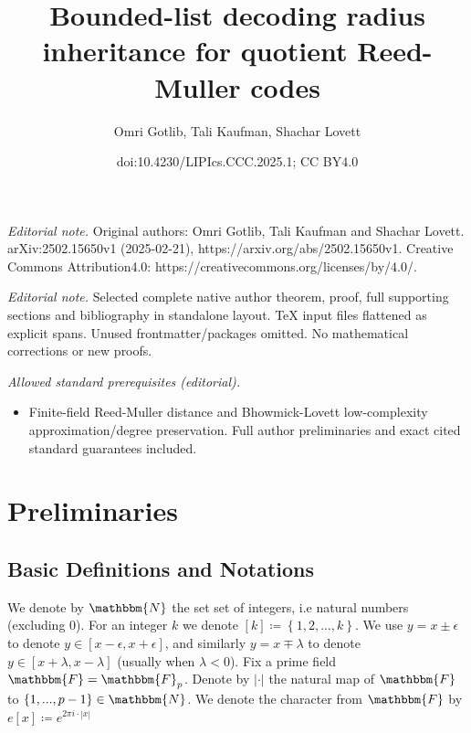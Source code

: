 \documentclass[10pt,a4paper]{article}
\title{Bounded-list decoding radius inheritance for quotient Reed-Muller codes}
\author{Omri Gotlib, Tali Kaufman, Shachar Lovett}
\date{doi:10.4230/LIPIcs.CCC.2025.1; CC BY4.0}
\newcommand{\definedas}[0]{\coloneqq}
\newcommand{\sparens}[1]{\left[ #1 \right]}
\newcommand{\set}[1]{\left\{ #1 \right\}}
\newcommand{\basefield}[0]{\mathbbm{F}}
\newcommand{\charfunc}[1]{e \sparens{#1}}
\newcommand{\genprime}[0]{p}
\newcommand{\naturalnumbersset}[0]{\mathbbm{N}}
\newcommand{\abs}[1]{\left| #1 \right|}
\begin{document}
\maketitle
\setcounter{section}{1}
\noindent\textit{Editorial note.} Original authors: Omri Gotlib, Tali Kaufman and Shachar Lovett. arXiv:2502.15650v1 (2025-02-21), https://arxiv.org/abs/2502.15650v1. Creative Commons Attribution4.0: https://creativecommons.org/licenses/by/4.0/.\par\medskip
\noindent\textit{Editorial note.} Selected complete native author theorem, proof, full supporting sections and bibliography in standalone layout. TeX input files flattened as explicit spans. Unused frontmatter/packages omitted. No mathematical corrections or new proofs.\par\medskip
\noindent\textit{Allowed standard prerequisites (editorial).}\begin{itemize}
\item Finite-field Reed-Muller distance and Bhowmick-Lovett low-complexity approximation/degree preservation. Full author preliminaries and exact cited standard guarantees included.
\end{itemize}\medskip
\section[Preliminaries]{Preliminaries}\label{sec:preliminaries}

\subsection{Basic Definitions and Notations}\label{subsec:definitions_and_notations}
We denote by $\naturalnumbersset$ the set set of integers, i.e natural numbers (excluding 0).
For an integer $k$ we denote $\sparens{k} \definedas \set{1,2,...,k}$.
We use $y = x \pm \epsilon$ to denote $y \in \sparens{x - \epsilon, x + \epsilon}$, and similarly $y = x \mp \lambda$ to denote $y \in \sparens{x + \lambda, x - \lambda}$ (usually when $\lambda < 0$).
\newline
Fix a prime field $\basefield = \basefield_{\genprime}$.
Denote by $\abs{\cdot}$ the natural map of $\basefield$ to $\set{1,...,\genprime - 1} \in \naturalnumbersset$.
We denote the character from $\basefield$ by $\charfunc{x} \definedas e^{2 \pi i \cdot \abs{x}}$
\end{document}
